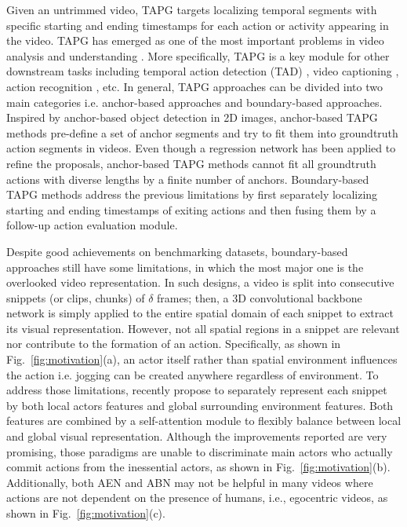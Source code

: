 \documentclass[sn-mathphys]{sn-jnl}
\theoremstyle{thmstyleone}\newtheorem{theorem}{Theorem}\newtheorem{proposition}[theorem]{Proposition}
\theoremstyle{thmstyletwo}\newtheorem{example}{Example}\newtheorem{remark}{Remark}
\theoremstyle{thmstylethree}\newtheorem{definition}{Definition}
\begin{document}
Given an untrimmed video, TAPG targets localizing temporal segments with specific starting and ending timestamps for each action or activity appearing in the video. TAPG has emerged as one of the most important problems in video analysis and understanding \cite{anchor_2, Jiyang2017, CTAP, Gao_2018_CVPR}. More specifically, TAPG is a key module for other downstream tasks including temporal action detection (TAD) \cite{caba2015activitynet, THUMOS14}, video captioning \cite{krishna2017dense}, action recognition \cite{Kinetics}, etc. In general, TAPG approaches can be divided into two main categories i.e. anchor-based approaches and boundary-based approaches. Inspired by anchor-based object detection in 2D images, anchor-based TAPG methods \cite{actionproposal_2016, FasterR_CNN_Action, anchor_1, anchor_2, anchor_3} pre-define a set of anchor segments and try to fit them into groundtruth action segments in videos. Even though a regression network has been applied to refine the proposals, anchor-based TAPG methods cannot fit all groundtruth actions with diverse lengths by a finite number of anchors. Boundary-based TAPG methods \cite{lin2018bsn, BSN++, bmn, dbg, xu2020gtad, KhoaVo_ICASSP, KhoaVo_Access} address the previous limitations by first separately localizing  starting and ending timestamps of exiting actions and then fusing them by a follow-up action evaluation module.

Despite good achievements on benchmarking datasets, boundary-based approaches \cite{lin2018bsn, BSN++, bmn, dbg, xu2020gtad} still have some limitations, in which the most major one is the overlooked video representation. In such designs, a video is split into consecutive snippets (or clips, chunks) of $\delta$ frames; then, a 3D convolutional backbone network \cite{C3D, i3d_2017, 2_stream_1, SlowFast} is simply applied to the entire spatial domain of each snippet to extract its visual representation. However, not all spatial regions in a snippet are relevant nor contribute to the formation of an action. Specifically, as shown in Fig.~\ref{fig:motivation}(a), an actor itself rather than spatial environment influences the action i.e. jogging can be created anywhere regardless of environment. To address those limitations, \cite{KhoaVo_ICASSP, KhoaVo_Access} recently propose to separately represent each snippet by both local actors features and global surrounding environment features. Both features are combined by a self-attention module to flexibly balance between local and global visual representation. 
Although the improvements reported \cite{KhoaVo_ICASSP, KhoaVo_Access} are very promising, those paradigms are unable to discriminate main actors who actually commit actions from the inessential actors, as shown in Fig.~\ref{fig:motivation}(b). Additionally, both AEN and ABN may not be helpful in many videos where actions are not dependent on the presence of humans, i.e., egocentric videos, as shown in Fig.~\ref{fig:motivation}(c).
\end{document}
